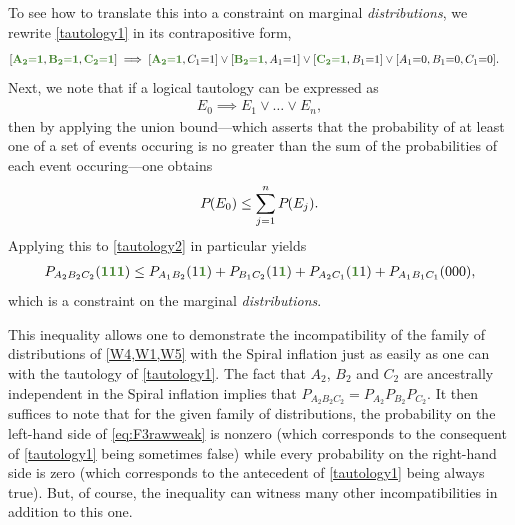 \documentclass[aps,english,superscriptaddress,onecolumn,twoside,longbibliography,pra,floatfix,fleqn,nofootinbib]{revtex4-1}%
\newcommand*{\mgreen}[1]{{\color{OliveGreen}{\mathbf{#1}}}}
\theoremstyle{definition}
\newcommand{\p}[2][]{{P_{#1}}\parenths{#2}}
\newcommand{\cramp}[1]{\ensuremath{\mathord{#1}}}
\newcommand{\eql}{\cramp{=}}
\DeclarePairedDelimiter{\parens}{\lparen}{\rparen}
\DeclarePairedDelimiter{\parenths}{\lparen}{\rparen}
\begin{document}
To see how to translate this into a constraint on marginal {\em distributions}, we rewrite \cref{tautology1} in its contrapositive form,
\begin{align}\begin{split}\label{tautology2}
&[\mgreen{A_2 \eql 1} , \mgreen{B_2 \eql 1} , \mgreen{C_2 \eql 1}]  \implies [\mgreen{A_2 \eql 1}, C_1 \eql 1] \lor  [\mgreen{B_2 \eql 1}, A_1 \eql 1] \lor  [\mgreen{C_2 \eql 1}, B_1 \eql 1] \lor  [A_1 \eql 0, B_1 \eql 0, C_1 \eql 0].
\end{split}\end{align}
Next, we note that if a logical tautology can be expressed as
\begin{align}\label{eq:inference}
    E_0 \implies E_1 \lor \ldots \lor E_n,
\end{align}
then by applying the union bound---which asserts that the probability of at least one of a set of events occuring is no greater than the sum of the probabilities of each event occuring---one obtains
\begin{align}\label{eq:possinference}
\p{E_0}\leq \sum\limits_{j=1}^n{\p{E_j}}.
\end{align}
Applying this to \cref{tautology2} in particular yields
\begin{align}\label{eq:F3rawweak}
P_{A_2 B_2 C_2}\parens{\mgreen{1} \mgreen{1} \mgreen{1}} \leq P_{A_1 B_2}\parens{1 \mgreen{1 }}+P_{ B_1 C_2}\parens{ 1 \mgreen{1}}+P_{A_2 C_1}\parens{\mgreen{1 } 1}+P_{A_1 B_1 C_1}\parens{0 0 0},
\end{align}
which is a constraint on the marginal {\em distributions}.
 
This inequality allows one to demonstrate the incompatibility of the family of distributions of \cref{W4,W1,W5} with the Spiral inflation just as easily as one can with the tautology of \cref{tautology1}. The fact that $A_2$, $B_2$ and $C_2$ are ancestrally independent in the Spiral inflation implies that $P_{A_2 B_2 C_2} = P_{A_2} P_{B_2} P_{C_2}$. 
 It then suffices to note that for the given family of distributions, the probability on the left-hand side of \cref{eq:F3rawweak} is nonzero (which corresponds to the consequent of \cref{tautology1} being sometimes false) while every probability on the right-hand side is zero (which corresponds to the antecedent of \cref{tautology1} being always true).  But, of course, the inequality can witness many other incompatibilities in addition to this one.
\end{document}
